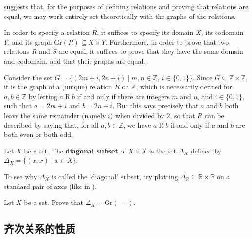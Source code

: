  suggests that, for the purposes of defining relations and proving that relations are equal, we may work entirely set theoretically with the graphs of the relations.

\begin{strategy}
\label{strRelationsAndGraphs}
In order to specify a relation $R$, it suffices to specify its domain $X$, its codomain $Y$, and its graph $\mathrm{Gr}(R) \subseteq X \times Y$. Furthermore, in order to prove that two relations $R$ and $S$ are equal, it suffices to prove that they have the same domain and codomain, and that their graphs are equal.
\end{strategy}

\begin{example}
Consider the set $G = \{ (2m+i, 2n+i) \mid m,n \in \mathbb{Z},~ i \in \{ 0,1 \} \}$. Since $G \subseteq \mathbb{Z} \times \mathbb{Z}$, it is the graph of a (unique) relation $R$ on $\mathbb{Z}$, which is necessarily defined for $a,b \in \mathbb{Z}$ by letting $a \mathrel{R} b$ if and only if there are integers $m$ and $n$, and $i \in \{0,1\}$, such that $a=2m+i$ and $b=2n+i$. But this says precisely that $a$ and $b$ both leave the same remainder (namely $i$) when divided by $2$, so that $R$ can be described by saying that, for all $a,b \in \mathbb{Z}$, we have $a \mathrel{R} b$ if and only if $a$ and $b$ are both even or both odd.
\end{example}

\begin{definition}
\label{defDiagonalSubset}
Let $X$ be a set. The \textbf{diagonal subset} of $X \times X$ is the set $\Delta_X$  defined by $\Delta_X = \{ (x,x) \mid x \in X \}$.
\end{definition}

To see why $\Delta_X$ is called the `diagonal' subset, try plotting $\Delta_{\mathbb{R}} \subseteq \mathbb{R} \times \mathbb{R}$ on a standard pair of axes (like in ).

\begin{exercise}
Let $X$ be a set. Prove that $\Delta_X = \mathrm{Gr}(=)$.
\end{exercise}

\subsection*{齐次关系的性质}

